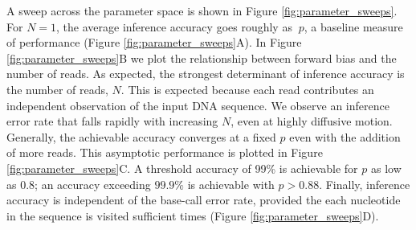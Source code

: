 \documentclass{biophys_letter}
\begin{document}
A sweep across the parameter space is shown in Figure \ref{fig:parameter_sweeps}.
For $N=1$, the average inference accuracy goes roughly as $~p$, a baseline measure of performance (Figure \ref{fig:parameter_sweeps}A).
In Figure \ref{fig:parameter_sweeps}B we plot the relationship between forward bias and the number of reads.
As expected, the strongest determinant of inference accuracy is the number of reads, $N$.
This is expected because each read contributes an independent observation of the input DNA sequence.
We observe an inference error rate that falls rapidly with increasing $N$, even at highly diffusive motion. 
Generally, the achievable accuracy converges at a fixed $p$ even with the addition of more reads.
This asymptotic performance is plotted in Figure \ref{fig:parameter_sweeps}C.
A threshold accuracy of 99\% is achievable for $p$ as low as $0.8$; an accuracy exceeding $99.9\%$ is achievable with $p>0.88$.
Finally, inference accuracy is independent of the base-call error rate, provided the each nucleotide in the sequence is visited sufficient times (Figure \ref{fig:parameter_sweeps}D).


\end{document}
